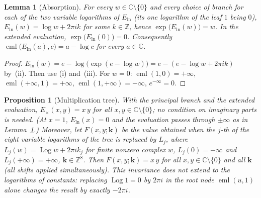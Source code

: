 \documentclass[11pt,a4paper]{article}
\newtheorem{lemma}[theorem]{Lemma}
\newtheorem{proposition}[theorem]{Proposition}
\theoremstyle{definition}
\newcommand{\eml}{\operatorname{eml}}
\newcommand{\Log}{\operatorname{Log}}   %
\newcommand{\C}{\mathbb{C}}
\begin{document}
\begin{lemma}[Absorption]
\label{lem:absorption}
For every $w\in\C\setminus\{0\}$ and every choice of branch for each of the
two variable logarithms of $E_{\ln}$ (its one logarithm of the leaf $1$
being $0$), $E_{\ln}(w)=\log w+2\pi i k$ for some $k\in\mathbb{Z}$, hence
$\exp\bigl(E_{\ln}(w)\bigr)=w$.  In the extended evaluation,
$\exp\bigl(E_{\ln}(0)\bigr)=0$.  Consequently
$\eml\bigl(E_{\ln}(a),c\bigr)=a-\log c$ for every $a\in\C$.
\end{lemma}

\begin{proof}
$E_{\ln}(w)=e-\log\bigl(\exp(e-\log w)\bigr)=e-(e-\log w+2\pi i k)$ by~(ii).
Then use (i) and~(iii).  For $w=0$: $\eml(1,0)=+\infty$,
$\eml(+\infty,1)=+\infty$, $\eml(1,+\infty)=-\infty$, $e^{-\infty}=0$.
\end{proof}

\begin{proposition}[Multiplication tree]
\label{prop:mul}
With the principal branch and the extended evaluation, $E_{\times}(x,y)=x\,y$
for all $x,y\in\C\setminus\{0\}$; no condition on imaginary parts is needed.
(At $x=1$, $E_{\ln}(x)=0$ and the evaluation passes through $\pm\infty$ as in
Lemma~\ref{lem:absorption}.)  Moreover, let $F(x,y;\mathbf k)$ be the value
obtained when the $j$-th of the eight variable logarithms of the tree is
replaced by $L_j$, where $L_j(w)=\Log w+2\pi i k_j$ for finite nonzero
complex $w$, $L_j(0)=-\infty$ and $L_j(+\infty)=+\infty$,
$\mathbf k\in\mathbb{Z}^8$.  Then
$F(x,y;\mathbf k)=x\,y$ for all $x,y\in\C\setminus\{0\}$ and all
$\mathbf k$ (all shifts applied simultaneously).  This invariance does \emph{not} extend to the
logarithms of constants: replacing $\Log 1=0$ by $2\pi i$ in the root node
$\eml(u,1)$ alone changes the result by exactly $-2\pi i$.
\end{proposition}
\end{document}
